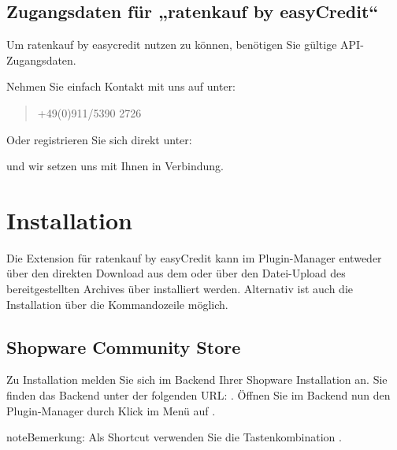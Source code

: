 \documentclass[a4paper,10pt,openany,oneside,ngerman]{sphinxmanual}
\begin{document}
\section{Zugangsdaten für „ratenkauf by easyCredit“}
\label{\detokenize{requirements:zugangsdaten-fur-ratenkauf-by-easycredit}}
Um ratenkauf by easycredit nutzen zu können, benötigen Sie gültige API-Zugangsdaten.

Nehmen Sie einfach Kontakt mit uns auf unter:
\begin{quote}


+49(0)911/5390 2726
\end{quote}

Oder registrieren Sie sich direkt unter:
\begin{quote}

\end{quote}

und wir setzen uns mit Ihnen in Verbindung.


\chapter{Installation}
\label{\detokenize{installation:installation}}\label{\detokenize{installation::doc}}
Die Extension für ratenkauf by easyCredit kann im Plugin-Manager entweder über den direkten Download aus dem  oder über den Datei-Upload des bereitgestellten Archives über  installiert werden.
Alternativ ist auch die Installation über die Kommandozeile möglich.


\section{Shopware Community Store}
\label{\detokenize{installation:shopware-community-store}}
Zu Installation melden Sie sich im Backend Ihrer Shopware Installation an. Sie finden das Backend unter der folgenden URL: .
Öffnen Sie im Backend nun den Plugin-Manager durch Klick im Menü auf .

\begin{sphinxadmonition}{note}{Bemerkung:}
Als Shortcut verwenden Sie die Tastenkombination .
\end{sphinxadmonition}
\end{document}
